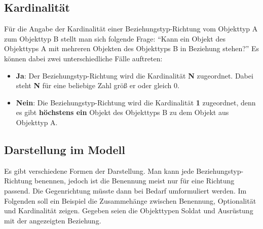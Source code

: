         \subsection{Kardinalität}
          Für die Angabe der Kardinalität einer Beziehungstyp-Richtung vom Objekttyp A zum Objekttyp B stellt man sich folgende Frage: \enquote{Kann ein Objekt des Objekttyps A mit mehreren Objekten des Objekttyps B in Beziehung stehen?} Es können dabei zwei unterschiedliche Fälle auftreten:
          \begin{itemize}
            \item \textbf{Ja}: Der Beziehungstyp-Richtung wird die Kardinalität \textbf{N} zugeordnet. Dabei steht \textbf{N} für eine beliebige Zahl größ er oder gleich 0.
            \item \textbf{Nein}: Die Beziehungstyp-Richtung wird die Kardinalität \textbf{1} zugeordnet, denn es gibt \textbf{höchstens ein} Objekt des Objekttyps B zu dem Objekt aus Objekttyp A.
          \end{itemize}
        \subsection{Darstellung im Modell}
          Es gibt verschiedene Formen der Darstellung. Man kann jede Beziehungstyp-Richtung benennen, jedoch ist die Benennung meist nur für eine Richtung passend. Die Gegenrichtung müsste dann bei Bedarf umformuliert werden. Im Folgenden soll ein Beispiel die Zusammehänge zwischen Benennung, Optionalität und Kardinalität zeigen. Gegeben seien die Objekttypen Soldat und Ausrüstung mit der angezeigten Beziehung.

